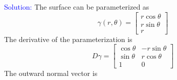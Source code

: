 \documentclass[12pt]{article}
\begin{document}
\bigskip

\textcolor{blue}{Solution:}
    The surface can be parameterized as 
    \[
        \gamma(r, \theta) = 
        \begin{bmatrix}
            r\cos \theta \\
            r\sin \theta \\
            r
        \end{bmatrix}
    \]
    The derivative of the parameterization is
    \[
        D\gamma = 
        \begin{bmatrix}
            \cos \theta & -r\sin \theta \\
            \sin \theta & r\cos \theta\\
            1 & 0
        \end{bmatrix}
    \]
    The outward normal vector is 
\end{document}

